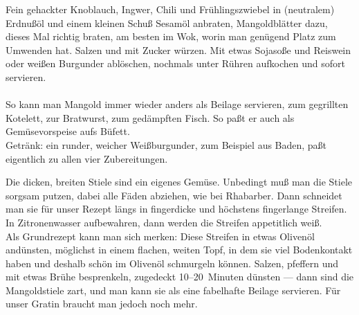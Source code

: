       \begin{zubereitung}
        Fein gehackter Knoblauch, Ingwer, Chili und Frühlingszwiebel
        in (neutralem) Erdnußöl und einem kleinen Schuß Sesamöl anbraten,
        Mangoldblätter dazu, dieses Mal richtig braten, am besten im Wok, worin
        man genügend Platz zum Umwenden hat. Salzen und mit Zucker würzen. Mit
        etwas Sojasoße und Reiswein oder weißen Burgunder ablöschen, nochmals
        unter Rühren aufkochen und sofort servieren.\\
        \\
        So kann man Mangold immer wieder anders als Beilage servieren, zum
        gegrillten Kotelett, zur Bratwurst, zum gedämpften Fisch. So paßt er
	auch als Gemüsevorspeise aufs Büfett. \\
        Getränk: ein runder, weicher Weißburgunder, zum Beispiel aus Baden,
	paßt eigentlich zu allen vier Zubereitungen. \\
      \end{zubereitung}


      \begin{einleitung}
        Die dicken, breiten Stiele sind ein eigenes Gemüse. Unbedingt muß man
	die Stiele sorgsam putzen, dabei alle Fäden abziehen, wie bei
	Rhabarber. Dann schneidet man sie für unser Rezept längs in fingerdicke
	und höchstens fingerlange Streifen. In Zitronenwasser aufbewahren, dann
	werden die Streifen appetitlich weiß. \\
        Als Grundrezept kann man sich merken: Diese Streifen in etwas Olivenöl
        andünsten, möglichst in einem flachen, weiten Topf, in dem sie viel
        Bodenkontakt haben und deshalb schön im Olivenöl schmurgeln können.
        Salzen, pfeffern und mit etwas Brühe besprenkeln, zugedeckt
        10--20~Minuten dünsten --- dann sind die Mangoldstiele zart, und man
        kann sie als eine fabelhafte Beilage servieren. Für unser Gratin
	braucht man jedoch noch mehr. \\
      \end{einleitung}

